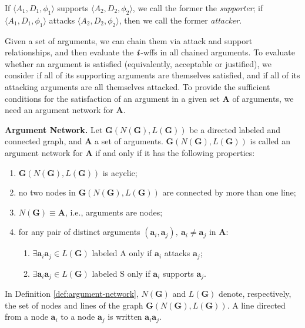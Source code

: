 \documentclass[10pt, conference, compsocconf]{IEEEtran}
\begin{document}
\begin{remark}
If $\langle A_{1}, D_{1}, \phi_{1} \rangle$ supports $\langle A_{2}, D_{2}, \phi_{2} \rangle$, we call the former the \textit{supporter}; if $\langle A_{1}, D_{1}, \phi_{1} \rangle$ attacks $\langle A_{2}, D_{2}, \phi_{2} \rangle$, then we call the former \textit{attacker}.
\end{remark}

Given a set of arguments, we can chain them via attack and support relationships, and then evaluate the $\textbf{\textit{i}}$-wffs in all chained arguments. To evaluate whether an argument is satisfied (equivalently, acceptable or justified), we consider if all of its supporting arguments are themselves satisfied, and if all of its attacking arguments are all themselves attacked. To provide the sufficient conditions for the satisfaction of an argument in a given set $\textbf{A}$ of arguments, we need an argument network for $\textbf{A}$. 

\begin{definition}\label{def:argument-network}
	\textbf{Argument Network.} Let $\textbf{G}(N(\textbf{G}), L(\textbf{G}))$ be a directed labeled and connected graph, and $\textbf{A}$ a set of arguments. $\textbf{G}(N(\textbf{G}), L(\textbf{G}))$ is called an argument network for $\textbf{A}$ if and only if it has the following properties:
		\begin{enumerate}
			\item{$\textbf{G}(N(\textbf{G}), L(\textbf{G}))$ is acyclic;}
			\item{no two nodes in $\textbf{G}(N(\textbf{G}), L(\textbf{G}))$ are connected by more than one line;}
			\item{$N(\textbf{G}) \equiv \textbf{A}$, i.e., arguments are nodes;}
			\item{for any pair of distinct arguments $(\textbf{a}_{i}, \textbf{a}_{j}),\ \textbf{a}_{i} \neq \textbf{a}_{j}$ in $\textbf{A}$:
				\begin{enumerate}
					\item{$\exists \textbf{a}_{i}\textbf{a}_{j} \in L(\textbf{G})$ labeled A only if $\textbf{a}_{i}$ attacks $\textbf{a}_{j}$;}
					\item{$\exists \textbf{a}_{i}\textbf{a}_{j} \in L(\textbf{G})$ labeled S only if $\textbf{a}_{i}$ supports $\textbf{a}_{j}$.}
				\end{enumerate}}
		\end{enumerate}
\end{definition}

\begin{remark}
In Definition \ref{def:argument-network}, $N(\textbf{G})$ and $L(\textbf{G})$ denote, respectively, the set of nodes and lines of the graph $\textbf{G}(N(\textbf{G}), L(\textbf{G}))$. A line directed from a node $\textbf{a}_{i}$ to a node $\textbf{a}_{j}$ is written $\textbf{a}_{i}\textbf{a}_{j}$. 
\end{remark}
\end{document}
